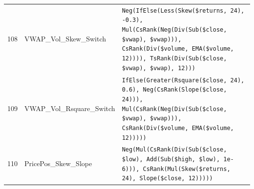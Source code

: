 \begin{longtable}{@{}llp{}@{}}
108 & VWAP\_Vol\_Skew\_Switch & \texttt{Neg(IfElse(Less(Skew(\$returns, 24), -0.3), Mul(CsRank(Neg(Div(Sub(\$close, \$vwap), \$vwap))), CsRank(Div(\$volume, EMA(\$volume, 12)))), TsRank(Div(Sub(\$close, \$vwap), \$vwap), 12)))} \\
109 & VWAP\_Vol\_Rsquare\_Switch & \texttt{IfElse(Greater(Rsquare(\$close, 24), 0.6), Neg(CsRank(Slope(\$close, 24))), Mul(CsRank(Neg(Div(Sub(\$close, \$vwap), \$vwap))), CsRank(Div(\$volume, EMA(\$volume, 12)))))} \\
110 & PricePos\_Skew\_Slope & \texttt{Neg(Mul(CsRank(Div(Sub(\$close, \$low), Add(Sub(\$high, \$low), 1e-6))), CsRank(Mul(Skew(\$returns, 24), Slope(\$close, 12)))))} \\
\end{longtable}
\endgroup